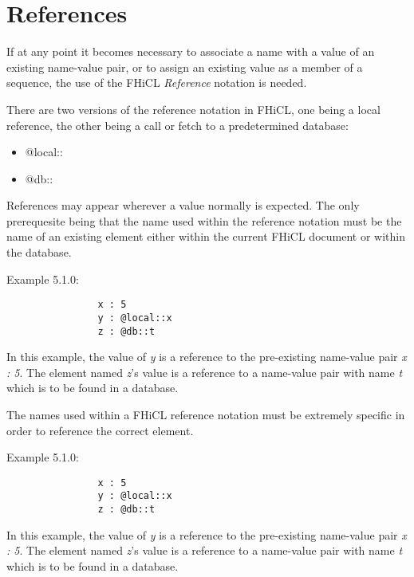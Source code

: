 \documentclass{memarticle}
\begin{document}
\chapter{References}
        If at any point it becomes necessary to associate a name with a value of an existing name-value pair, or to
        assign an existing value as a member of a sequence,
        the use of the FHiCL \emph{Reference} notation is needed.
        \par
        There are two versions of the reference notation in FHiCL, one being a local reference,
        the other being a call or fetch to a predetermined database:
        \begin{itemize}
                \item @local::
                \item @db::
        \end{itemize}
        \par
        References may appear wherever a value normally is expected.
        The only prerequesite being that the name used within the reference notation must be the name of an existing element
        either within the current FHiCL document
        or within the database.
        \par
        Example 5.1.0:
        \begin{verbatim}
                x : 5
                y : @local::x
                z : @db::t
        \end{verbatim}
        \par
        In this example, the value of \emph{y} is a reference to the pre-existing name-value pair \emph{x : 5}.
        The element named \emph{z}'s value is a reference to a name-value pair with name \emph{t}
        which is to be found in a database.
        \par
        The names used within a FHiCL reference notation must be extremely specific in order to reference the correct element.
        \par
        Example 5.1.0:
        \begin{verbatim}
                x : 5
                y : @local::x
                z : @db::t
        \end{verbatim}
        \par
        In this example, the value of \emph{y} is a reference to the pre-existing name-value pair \emph{x : 5}.
        The element named \emph{z}'s value is a reference to a name-value pair with name \emph{t}
        which is to be found in a database.
        \par
\end{document}
